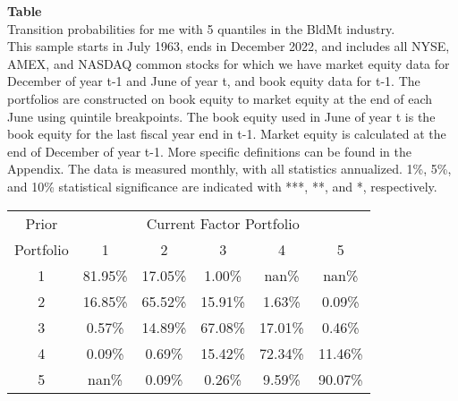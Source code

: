 \begin{table*}[ht!]
\raggedright
{}
\label{tab: transition_probs_me_BldMt_with_5_quantiles}
\textbf{Table \thetable} \\
Transition probabilities for me with 5 quantiles in the BldMt industry. \\
\hspace*{1em}This sample starts in July 1963, ends in December 2022, and includes all NYSE, AMEX, and NASDAQ common stocks for which we have market equity data for December of year t-1 and June of year t, and book equity data for t-1. The portfolios are constructed on book equity to market equity at the end of each June using quintile breakpoints.  The book equity used in June of year t is the book equity for the last fiscal year end in t-1.  Market equity is calculated at the end of December of year t-1.  More specific definitions can be found in the Appendix.  The data is measured monthly, with all statistics annualized.  1\%, 5\%, and 10\% statistical significance are indicated with ***, **, and *, respectively. \\
\vspace{0.5em}
\centering
\begin{adjustbox}{max width=\textwidth}
\begin{tabular}{@{}cccccc@{}}
\toprule
Prior & \multicolumn{5}{c}{Current Factor Portfolio} \\
Portfolio & 1 & 2 & 3 & 4 & 5 \\
\midrule
1 & 81.95\% & 17.05\% & 1.00\% & nan\% & nan\% \\
2 & 16.85\% & 65.52\% & 15.91\% & 1.63\% & 0.09\% \\
3 & 0.57\% & 14.89\% & 67.08\% & 17.01\% & 0.46\% \\
4 & 0.09\% & 0.69\% & 15.42\% & 72.34\% & 11.46\% \\
5 & nan\% & 0.09\% & 0.26\% & 9.59\% & 90.07\% \\
\bottomrule
\end{tabular}
\end{adjustbox}
\end{table*}